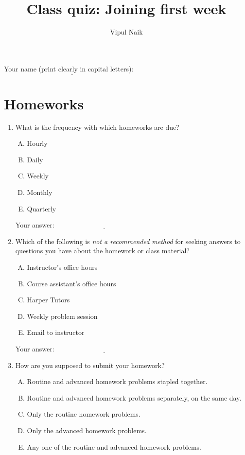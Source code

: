 \documentclass[10pt]{amsart}
\title{Class quiz: Joining first week}
\author{Vipul Naik}
\begin{document}
\maketitle

Your name (print clearly in capital letters): $\underline{\qquad\qquad\qquad\qquad\qquad\qquad\qquad\qquad\qquad\qquad}$

\section{Homeworks}

\begin{enumerate}
\item What is the frequency with which homeworks are due?

  \begin{enumerate}[(A)]
  \item Hourly
  \item Daily
  \item Weekly
  \item Monthly
  \item Quarterly
  \end{enumerate}

  \vspace{0.1in}
  Your answer: $\underline{\qquad\qquad\qquad\qquad\qquad\qquad\qquad}$
  \vspace{0.1in}

\item Which of the following is {\em not a recommended method} for
  seeking answers to questions you have about the homework or class
  material?

  \begin{enumerate}[(A)]
  \item Instructor's office hours
  \item Course assistant's office hours
  \item Harper Tutors
  \item Weekly problem session
  \item Email to instructor
  \end{enumerate}

  \vspace{0.1in}
  Your answer: $\underline{\qquad\qquad\qquad\qquad\qquad\qquad\qquad}$
  \vspace{0.1in}

\item How are you supposed to submit your homework?

  \begin{enumerate}[(A)]
  \item Routine and advanced homework problems stapled together.
  \item Routine and advanced homework problems separately, on the same
    day.
  \item Only the routine homework problems.
  \item Only the advanced homework problems.
  \item Any one of the routine and advanced homework problems.
  \end{enumerate}


\end{enumerate}
\end{document}
